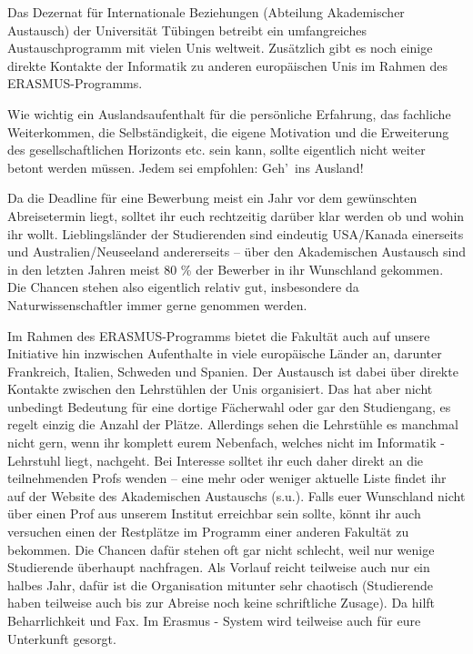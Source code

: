 Das Dezernat für Internationale Beziehungen (Abteilung Akademischer Austausch) der Universität Tübingen betreibt ein umfangreiches Austauschprogramm mit vielen Unis weltweit. Zusätzlich gibt es noch einige direkte Kontakte der Informatik zu anderen europäischen Unis im Rahmen des ERASMUS-Programms.

Wie wichtig ein Auslandsaufenthalt für die persönliche Erfahrung, das fachliche Weiterkommen, die Selbständigkeit, die eigene Motivation und die Erweiterung des gesellschaftlichen Horizonts etc. sein kann, sollte eigentlich nicht weiter betont werden müssen. Jedem sei empfohlen: Geh'\ ins Ausland!

Da die Deadline für eine Bewerbung meist ein Jahr vor dem gewünschten Abreisetermin liegt, solltet ihr euch rechtzeitig darüber klar werden ob und wohin ihr wollt.  Lieblingsländer der Studierenden sind eindeutig USA/Kanada einerseits und Australien/Neuseeland andererseits %
 -- über den Akademischen Austausch sind in den letzten Jahren meist 80 \% der Bewerber in ihr Wunschland gekommen. Die Chancen stehen also eigentlich relativ gut, insbesondere da Naturwissenschaftler immer gerne genommen werden.

Im Rahmen des ERASMUS-Programms bietet die Fakultät auch auf unsere Initiative hin inzwischen Aufenthalte in viele europäische Länder an, darunter Frankreich, Italien, Schweden und Spanien. Der Austausch ist dabei über direkte Kontakte zwischen den Lehrstühlen der Unis organisiert. Das hat aber nicht unbedingt Bedeutung für eine dortige Fächerwahl oder gar den Studiengang, es regelt einzig die Anzahl der Plätze. Allerdings sehen die Lehrstühle es manchmal nicht gern, wenn ihr komplett eurem Nebenfach, welches nicht im Informatik - Lehrstuhl liegt, nachgeht. 
Bei Interesse solltet ihr euch daher direkt an die teilnehmenden Profs wenden -- eine mehr oder weniger aktuelle Liste findet ihr auf der Website des Akademischen Austauschs (s.u.). Falls euer Wunschland nicht über einen Prof aus unserem Institut erreichbar sein sollte, könnt ihr auch versuchen einen der Restplätze im Programm einer anderen Fakultät zu bekommen. Die Chancen dafür stehen oft gar nicht schlecht, weil nur wenige Studierende überhaupt nachfragen. Als Vorlauf reicht teilweise auch nur ein halbes Jahr, dafür ist die Organisation mitunter sehr chaotisch (Studierende haben teilweise auch bis zur Abreise noch keine schriftliche Zusage). Da hilft Beharrlichkeit und Fax.  Im Erasmus - System wird teilweise auch für eure Unterkunft gesorgt. 

